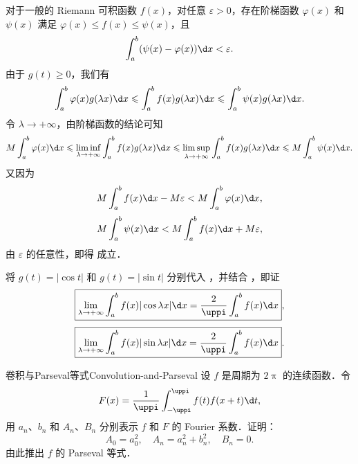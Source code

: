 \begin{myproof}
    对于一般的 Riemann 可积函数 $f(x)$，对任意 $\varepsilon > 0$，存在阶梯函数 $\varphi(x)$ 和 $\psi(x)$ 满足 $\varphi(x) \leqslant f(x) \leqslant \psi(x)$，且
    \begin{equation}
        \int_{a}^{b} (\psi(x) - \varphi(x)) \d x < \varepsilon.
    \end{equation}
    由于 $g(t) \geqslant 0$，我们有
    \begin{equation}
        \int_{a}^{b} \varphi(x) g(\lambda x) \d x \leqslant \int_{a}^{b} f(x) g(\lambda x) \d x \leqslant \int_{a}^{b} \psi(x) g(\lambda x) \d x.
    \end{equation}
    令 $\lambda \to +\infty$，由阶梯函数的结论可知
    \begin{equation}
        M \int_{a}^{b} \varphi(x) \d x \leqslant \liminf_{\lambda \to +\infty} \int_{a}^{b} f(x) g(\lambda x) \d x \leqslant \limsup_{\lambda \to +\infty} \int_{a}^{b} f(x) g(\lambda x) \d x \leqslant M \int_{a}^{b} \psi(x) \d x.
    \end{equation}
    又因为
    \begin{equation}
        M \int_{a}^{b} f(x) \d x - M \varepsilon < M \int_{a}^{b} \varphi(x) \d x,
    \end{equation}
    \begin{equation}
        M \int_{a}^{b} \psi(x) \d x < M \int_{a}^{b} f(x) \d x + M \varepsilon,
    \end{equation}
    由 $\varepsilon$ 的任意性，即得  成立．

    将 $g(t) = |\cos t|$ 和 $g(t) = |\sin t|$ 分别代入 ，并结合 ，即证
    \begin{equation}
        \boxed{\lim_{\lambda \to +\infty} \int_{a}^{b} f(x)| \cos \lambda x | \d x = \frac{2}{\uppi} \int_{a}^{b} f(x) \d x},
    \end{equation}
    \begin{equation}
        \boxed{\lim_{\lambda \to +\infty} \int_{a}^{b} f(x)| \sin \lambda x | \d x = \frac{2}{\uppi} \int_{a}^{b} f(x) \d x}.
    \end{equation}
\end{myproof}

\begin{problem}{卷积与Parseval等式}{Convolution-and-Parseval}
    设 $f$ 是周期为 $2\uppi$ 的连续函数．令
    \begin{equation}
        F(x) = \frac{1}{\uppi} \int_{-\uppi}^{\uppi} f(t)f(x + t) \d t,
    \end{equation}
    用 $a_n$、$b_n$ 和 $A_n$、$B_n$ 分别表示 $f$ 和 $F$ 的 Fourier 系数．证明：
    \begin{equation}
        A_0 = a_0^2, \quad A_n = a_n^2 + b_n^2, \quad B_n = 0.
    \end{equation}
    由此推出 $f$ 的 Parseval 等式．
\end{problem}

